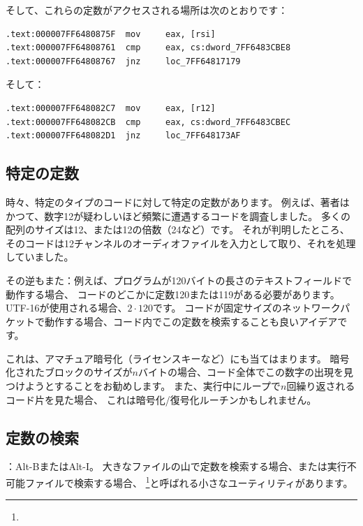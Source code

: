 そして、これらの定数がアクセスされる場所は次のとおりです：

\begin{lstlisting}[caption=dhcpcore.dll (Windows 7 x64),style=customasmx86]
.text:000007FF6480875F  mov     eax, [rsi]
.text:000007FF64808761  cmp     eax, cs:dword_7FF6483CBE8
.text:000007FF64808767  jnz     loc_7FF64817179
\end{lstlisting}

そして：

\begin{lstlisting}[caption=dhcpcore.dll (Windows 7 x64),style=customasmx86]
.text:000007FF648082C7  mov     eax, [r12]
.text:000007FF648082CB  cmp     eax, cs:dword_7FF6483CBEC
.text:000007FF648082D1  jnz     loc_7FF648173AF
\end{lstlisting}

\subsection{特定の定数}

時々、特定のタイプのコードに対して特定の定数があります。
例えば、著者はかつて、数字12が疑わしいほど頻繁に遭遇するコードを調査しました。
多くの配列のサイズは12、または12の倍数（24など）です。
それが判明したところ、そのコードは12チャンネルのオーディオファイルを入力として取り、それを処理していました。

その逆もまた：例えば、プログラムが120バイトの長さのテキストフィールドで動作する場合、
コードのどこかに定数120または119がある必要があります。
UTF-16が使用される場合、$2 \cdot 120$です。
コードが固定サイズのネットワークパケットで動作する場合、コード内でこの定数を検索することも良いアイデアです。

これは、アマチュア暗号化（ライセンスキーなど）にも当てはまります。
暗号化されたブロックのサイズが$n$バイトの場合、コード全体でこの数字の出現を見つけようとすることをお勧めします。
また、実行中にループで$n$回繰り返されるコード片を見た場合、
これは暗号化/復号化ルーチンかもしれません。

\subsection{定数の検索}

：Alt-BまたはAlt-I。
大きなファイルの山で定数を検索する場合、または実行不可能ファイルで検索する場合、
\footnote{\BGREPURL}と呼ばれる小さなユーティリティがあります。